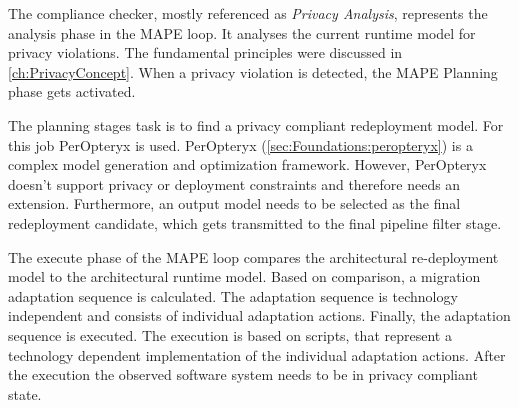 The compliance checker, mostly referenced as \textit{Privacy Analysis}, represents the analysis phase in the MAPE loop. It analyses the current runtime model for privacy violations. The fundamental principles were discussed in \autoref{ch:PrivacyConcept}. When a privacy violation is detected, the MAPE Planning phase gets activated.

The planning stages task is to find a privacy compliant redeployment model. For this job PerOpteryx is used. PerOpteryx (\autoref{sec:Foundations:peropteryx}) is a complex model generation and optimization framework. However, PerOpteryx doesn't support privacy or deployment constraints and therefore needs an extension. Furthermore, an output model needs to be selected as the final redeployment candidate, which gets transmitted to the final pipeline filter stage.

The execute phase of the MAPE loop compares the architectural re-deployment model to the architectural runtime model. Based on comparison, a migration adaptation sequence is calculated. The adaptation sequence is technology independent and consists of individual adaptation actions. Finally, the adaptation sequence is executed. The execution is based on scripts, that represent a technology dependent implementation of the individual adaptation actions. After the execution the observed software system needs to be in privacy compliant state.


